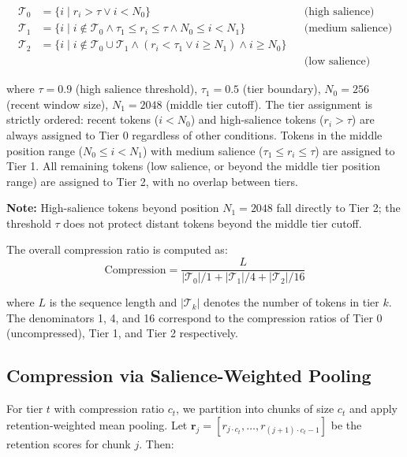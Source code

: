 \documentclass[11pt]{article}
\begin{document}
\small
\begin{equation}
\begin{aligned}
\mathcal{T}_0 &= \{i \mid r_i > \tau \lor i < N_0\} && \text{(high salience)} \\
\mathcal{T}_1 &= \{i \mid i \notin \mathcal{T}_0 \land \tau_1 \leq r_i \leq \tau \land N_0 \leq i < N_1\} && \text{(medium salience)} \\
\mathcal{T}_2 &= \{i \mid i \notin \mathcal{T}_0 \cup \mathcal{T}_1 \land (r_i < \tau_1 \lor i \geq N_1) \land i \geq N_0\} \\
& && \text{(low salience)}
\end{aligned}
\end{equation}
\normalsize

where $\tau=0.9$ (high salience threshold), $\tau_1=0.5$ (tier boundary), $N_0=256$ (recent window size), $N_1=2048$ (middle tier cutoff). The tier assignment is strictly ordered: recent tokens ($i < N_0$) and high-salience tokens ($r_i > \tau$) are always assigned to Tier 0 regardless of other conditions. Tokens in the middle position range ($N_0 \leq i < N_1$) with medium salience ($\tau_1 \leq r_i \leq \tau$) are assigned to Tier 1. All remaining tokens (low salience, or beyond the middle tier position range) are assigned to Tier 2, with no overlap between tiers.

\textbf{Note:} High-salience tokens beyond position $N_1=2048$ fall directly to Tier 2; the threshold $\tau$ does not protect distant tokens beyond the middle tier cutoff.

The overall compression ratio is computed as:
\begin{equation}
\text{Compression} = \frac{L}{|\mathcal{T}_0|/1 + |\mathcal{T}_1|/4 + |\mathcal{T}_2|/16}
\end{equation}

where $L$ is the sequence length and $|\mathcal{T}_k|$ denotes the number of tokens in tier $k$. The denominators 1, 4, and 16 correspond to the compression ratios of Tier 0 (uncompressed), Tier 1, and Tier 2 respectively.

\subsection{Compression via Salience-Weighted Pooling}

For tier $t$ with compression ratio $c_t$, we partition into chunks of size $c_t$ and apply retention-weighted mean pooling. Let $\mathbf{r}_j = [r_{j \cdot c_t}, \ldots, r_{(j+1) \cdot c_t - 1}]$ be the retention scores for chunk $j$. Then:
\end{document}
